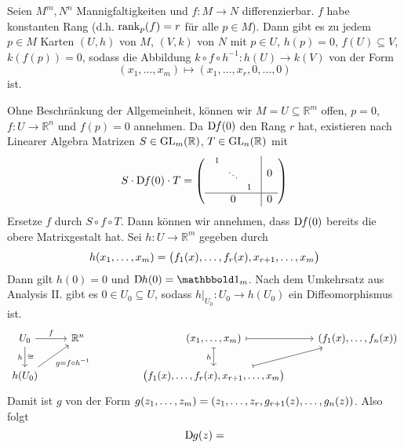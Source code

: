 \begin{satz}[{name={Rangsatz}},label=satz:rangsatz]
	Seien $M^m,N^n$ Mannigfaltigkeiten und $f \colon M \to N$ differenzierbar.
	$f$ habe konstanten Rang (d.h. $\rank_p(f) = r$ für alle $p \in M$).
	Dann gibt es zu jedem $p \in M$ Karten $(U,h)$ von $M$, $(V,k)$ von $N$ mit $p \in U$, $h(p)=0$, $f(U) \subseteq V$, $k(f(p))=0$, sodass die Abbildung $k \circ f \circ h^{-1} \colon h(U) \to k(V)$ von der Form 
	\[
		(x_1, \ldots ,x_m) \longmapsto (x_1,\ldots ,x_r,0, \ldots ,0) 
	\]
	ist.
\end{satz}
\begin{beweis}
	Ohne Beschränkung der Allgemeinheit, können wir $M=U \subseteq \mathbb{R}^m$ offen, $p=0$, $f \colon U \to \mathbb{R}^n$ und $f(p)=0$ annehmen.
	Da $\D f(0)$ den Rang $r$ hat, existieren nach Linearer Algebra Matrizen $S \in \GL_m(\mathbb{R})$, $T \in \GL_n(\mathbb{R})$ mit
	\[
		S \cdot \D f(0) \cdot T = 
		\enbrace*{\begin{array}{c|c}
			\scalebox{.8}{$\begin{array}{ccc}
				1 & & \\
				& \ddots & \\
				& & 1
			\end{array}$} & 0 \\ \hline
			0 & 0
		\end{array}}
	\]
	Ersetze $f$ durch $S \circ f \circ T$.
	Dann können wir annehmen, dass $\D f(0)$ bereits die obere Matrixgestalt hat.
	Sei $h \colon U \to \mathbb{R}^m$ gegeben durch 
	\[
		h(x_1, \ldots ,x_m) = \enbrace[\big]{f_1(x), \ldots , f_r(x), x_{r+1}, \ldots , x_m}
	\]
	Dann gilt $h(0)=0$ und $\D h(0) = \ind_m$.
	Nach dem Umkehrsatz aus Analysis II. gibt es $0 \in U_0 \subseteq U$, sodass $h|_{U_0} \colon U_0 \to h(U_0)$ ein Diffeomorphismus ist.
	\[
		\begin{tikzcd}
			U_0 \rar["f"] \dar["h"',"\cong"] & \mathbb{R}^n & & (x_1, \ldots ,x_m) \rar[mapsto] \dar[mapsto,"h"'] & \enbrace*{f_1(x), \ldots , f_n(x)} \\
			h(U_0) \urar["g=f \circ h^{-1}"'] & & &  \enbrace[\big]{f_1(x), \ldots , f_r(x), x_{r+1}, \ldots ,x_m} \urar[mapsto]
		\end{tikzcd}
	\]
	Damit ist $g$ von der Form $g(z_1, \ldots ,z_m) = \enbrace*{z_1, \ldots ,z_r, g_{r+1}(z), \ldots , g_n(z)}$.
	Also folgt
	\[
		\D g(z) = 
\]
\end{beweis}
